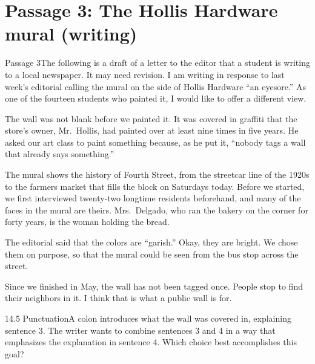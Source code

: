 \documentclass[11pt]{article}
\begin{document}
\section{Passage 3: The Hollis Hardware mural (writing)}

\begin{passage}{Passage 3}{The following is a draft of a letter to the editor that a student is writing to a local newspaper. It may need revision.}
  I am writing in response to last week's editorial calling the mural on the side of Hollis Hardware ``an eyesore.''  As one of the fourteen students who painted it, I would like to offer a different view.

  The wall was not blank before we painted it.  It was covered in graffiti that the store's owner, Mr.\ Hollis, had painted over at least nine times in five years.  He asked our art class to paint something because, as he put it, ``nobody tags a wall that already says something.''

  The mural shows the history of Fourth Street, from the streetcar line of the 1920s to the farmers market that fills the block on Saturdays today.  Before we started, we first interviewed twenty-two longtime residents beforehand, and many of the faces in the mural are theirs.  Mrs.\ Delgado, who ran the bakery on the corner for forty years, is the woman holding the bread.

  The editorial said that the colors are ``garish.''  Okay, they are bright.  We chose them on purpose, so that the mural could be seen from the bus stop across the street.

  Since we finished in May, the wall has not been tagged once.  People stop to find their neighbors in it.  I think that is what a public wall is for.
\end{passage}

\begin{q}{1}{4.5 Punctuation}{A colon introduces what the wall was covered in, explaining sentence 3.}
The writer wants to combine sentences 3 and 4 in a way that emphasizes the explanation in sentence 4. Which choice best accomplishes this goal?
\end{q}
\end{document}
